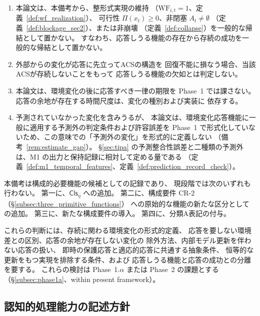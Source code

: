 \begin{remark}
\begin{enumerate}[label=(\alph*)]
  \item 本論文は、本備考から、整形式実現の維持
  （$\mathrm{WF}_{i,t}=1$、定義~\ref{def:wf_realization}）、
  可行性 $\Pi(x_t)\geq0$、非閉塞 $A_t\neq\emptyset$
  （定義~\ref{def:blockage_sec2}）、または非崩壊
  （定義~\ref{def:collapse}）を一般的な帰結として置かない。
  すなわち、応答しうる機能の存在から存続の成功を一般的な帰結として置かない。

  \item 外部からの変化が応答に先立ってACSの構造を
  回復不能に損なう場合、当該ACSが存続しないことをもって
  応答しうる機能の欠如とは判定しない。

  \item 本論文は、環境変化の後に応答すべき一律の期限を
  Phase~1 では課さない。
  応答の余地が存在する時間尺度は、変化の種別および実装に
  依存する。

  \item 予測されていなかった変化を含みうるが、
  本論文は、環境変化応答機能に一般に適用する予測外の判定条件および許容誤差を
  Phase~1 で形式化していないため、この意味での「予測外の変化」を形式的に定義しない
  （備考~\ref{rem:estimate_gap}）。
  \S\ref{sec:tipa} の予測整合性誤差と二種類の予測外は、M1 の出力と保持記録に相対して定める量である
  （定義~\ref{def:m1_temporal_features}、定義~\ref{def:prediction_record_check}）。
\end{enumerate}

本備考は構成的必要機能の候補としての記録であり、
現段階では次のいずれも行わない。
第一に、$\mathsf{Cls}_\eta$ への追加。
第二に、構成要件 CR-2（\S\ref{subsec:three_primitive_functions}）
への原始的な機能の新たな区分としての追加。
第三に、新たな構成要件の導入。
第四に、分類A表記の付与。

これらの判断には、存続に関わる環境変化の形式的定義、
応答を要しない環境差との区別、応答の余地が存在しない変化の
除外方法、内部モデル更新を伴わない応答の扱い、
即時の保護応答と適応的応答に共通する抽象条件、
恒等的な更新をもつ実現を排除する条件、および
応答しうる機能と応答の成功との分離を要する。
これらの検討は Phase~1.$\alpha$ または Phase~2 の課題とする
（\S\ref{subsec:phase1a}、within present framework）。
\end{remark}

\subsection{認知的処理能力の記述方針}
\label{subsec:cognitive_capacity_policy}

